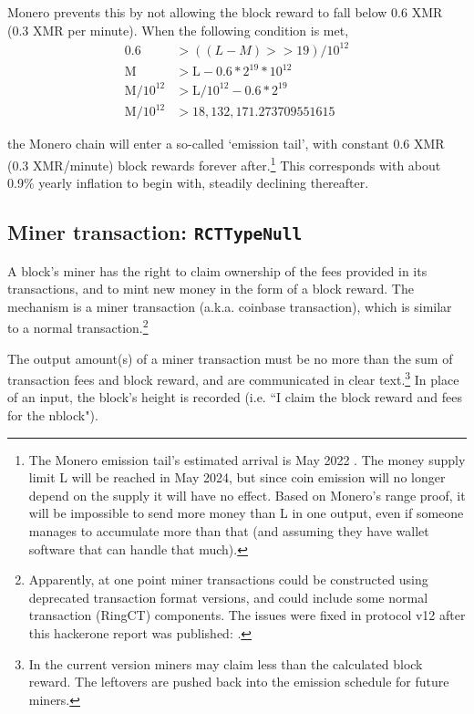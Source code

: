 Monero prevents this by not allowing the block reward to fall below 0.6 XMR (0.3 XMR per minute). When the following condition is met,\vspace{.175cm}
\begin{align*}
               0.6 &> ((L-M) >> 19)/10^{12} \\
        \textrm{M} &> \textrm{L} - 0.6*2^{19}*10^{12} \\
\textrm{M}/10^{12} &> \textrm{L}/10^{12} - 0.6*2^{19} \\
\textrm{M}/10^{12} &> 18,132,171.273709551615
\end{align*}

the Monero chain will enter a so-called `emission tail', with constant 0.6 XMR (0.3 XMR/minute) block rewards forever after.\footnote{The Monero emission tail's estimated arrival is May 2022 \cite{monero-tail-emission}. The money supply limit L will be reached in May 2024, but since coin emission will no longer depend on the supply it will have no effect. Based on Monero's range proof, it will be impossible to send more money than L in one output, even if someone manages to accumulate more than that (and assuming they have wallet software that can handle that much).} This corresponds with about 0.9\% yearly inflation to begin with, steadily declining thereafter.


\subsection{Miner transaction: {\tt RCTTypeNull}}
\label{subsec:miner-transaction} %

A block's miner has the right to claim ownership of the fees provided in its transactions, and to mint new money in the form of a block reward. The mechanism is a miner transaction (a.k.a. coinbase transaction), which is similar to a normal transaction.\footnote{Apparently, at one point miner transactions could be constructed using deprecated transaction format versions, and could include some normal transaction (RingCT) components. The issues were fixed in protocol v12 after this hackerone report was published: \cite{miner-tx-checks}.}

The output amount(s) of a miner transaction must be no more than the sum of transaction fees and block reward, and are communicated in clear text.\footnote{In the current version miners may claim less than the calculated block reward. The leftovers are pushed back into the emission schedule for future miners.} In place of an input, the block's height is recorded (i.e. ``I claim the block reward and fees for the n\nth block").

